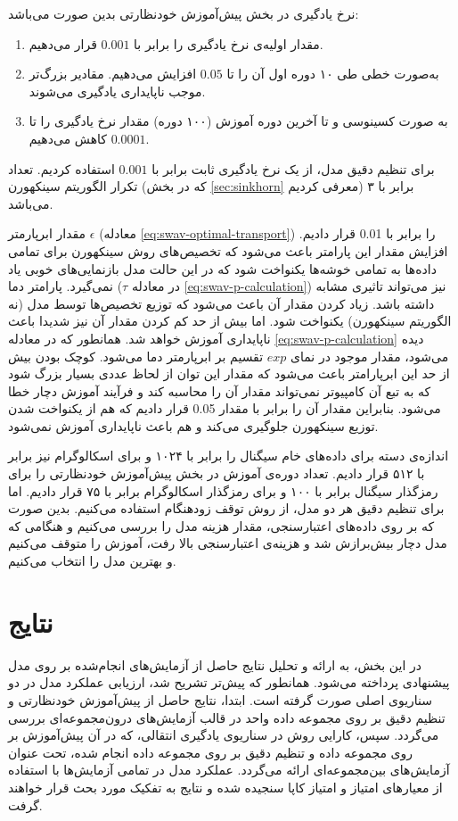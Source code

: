 نرخ یادگیری در بخش پیش‌آموزش خودنظارتی بدین صورت می‌باشد:
\begin{enumerate}
    \item مقدار اولیه‌ی نرخ یادگیری را برابر با $0.001$ قرار می‌دهیم.
    \item به‌صورت خطی طی ۱۰ دوره اول آن را تا $0.05$ افزایش می‌دهیم. مقادیر بزرگ‌تر موجب ناپایداری یادگیری می‌شوند.
    \item به صورت کسینوسی و تا آخرین دوره آموزش (۱۰۰ دوره) مقدار نرخ یادگیری را تا $0.0001$ کاهش می‌دهیم.
\end{enumerate}
برای تنظیم دقیق مدل، از یک نرخ یادگیری ثابت برابر با $0.001$ استفاده کردیم.
تعداد تکرار الگوریتم سینکهورن (که در بخش \ref{sec:sinkhorn} معرفی کردیم) برابر با ۳ می‌باشد.

مقدار ابرپارمتر $\epsilon$ (معادله \ref{eq:swav-optimal-transport}) را برابر با 0.01 قرار دادیم. افزایش مقدار این پارامتر باعث می‌شود که تخصیص‌های روش سینکهورن برای تمامی داده‌ها به تمامی خوشه‌ها یکنواخت شود که در این حالت مدل بازنمایی‌های خوبی یاد نمی‌گیرد. پارامتر دما ($\tau$ در معادله \ref{eq:swav-p-calculation}) نیز می‌تواند تاثیری مشابه داشته باشد. زیاد کردن مقدار آن باعث می‌شود که توزیع تخصیص‌ها توسط مدل (نه الگوریتم سینکهورن) یکنواخت شود. اما بیش از حد کم کردن مقدار آن نیز شدیدا باعث ناپایداری آموزش خواهد شد. همانطور که در معادله \ref{eq:swav-p-calculation} دیده می‌شود،
مقدار موجود در نمای $exp$ تقسیم بر ابرپارمتر دما می‌شود. کوچک بودن بیش از حد این ابرپارامتر باعث می‌شود که مقدار این توان از لحاظ عددی بسیار بزرگ شود که به تبع آن کامپیوتر نمی‌تواند مقدار آن را محاسبه کند و فرآیند آموزش دچار  خطا می‌شود. بنابراین مقدار آن را برابر با مقدار 0.05 قرار دادیم که هم از یکنواخت شدن توزیع سینکهورن جلوگیری می‌کند و هم باعث ناپایداری آموزش نمی‌شود.

اندازه‌ی دسته برای داده‌های خام سیگنال را برابر با ۱۰۲۴ و برای اسکالوگرام نیز برابر با ۵۱۲ قرار دادیم. تعداد دوره‌ی آموزش در بخش پیش‌آموزش خودنظارتی را برای رمزگذار سیگنال برابر با ۱۰۰ و برای رمزگذار اسکالوگرام برابر با ۷۵ قرار دادیم. اما برای تنظیم دقیق هر دو مدل، از روش توقف زودهنگام
استفاده می‌کنیم. بدین صورت که بر روی داده‌های اعتبارسنجی، مقدار هزینه مدل را بررسی می‌کنیم و هنگامی که مدل دچار بیش‌برازش شد و هزینه‌ی اعتبارسنجی بالا رفت، آموزش را متوقف می‌کنیم و بهترین مدل را انتخاب می‌کنیم.

\section{نتایج}

در این بخش، به ارائه و تحلیل نتایج حاصل از آزمایش‌های انجام‌شده بر روی مدل پیشنهادی پرداخته می‌شود. همانطور که پیش‌تر تشریح شد، ارزیابی عملکرد مدل در دو سناریوی اصلی صورت گرفته است. ابتدا، نتایج حاصل از پیش‌آموزش خودنظارتی و تنظیم دقیق بر روی مجموعه داده واحد 
در قالب آزمایش‌های درون‌مجموعه‌ای بررسی می‌گردد.
سپس، کارایی روش در سناریوی یادگیری انتقالی، که در آن پیش‌آموزش بر روی مجموعه داده 
و تنظیم دقیق بر روی مجموعه داده 
انجام شده، تحت عنوان آزمایش‌های بین‌مجموعه‌ای ارائه می‌گردد.
عملکرد مدل در تمامی آزمایش‌ها با استفاده از معیارهای امتیاز
و امتیاز کاپا سنجیده شده و نتایج به تفکیک مورد بحث قرار خواهند گرفت.


